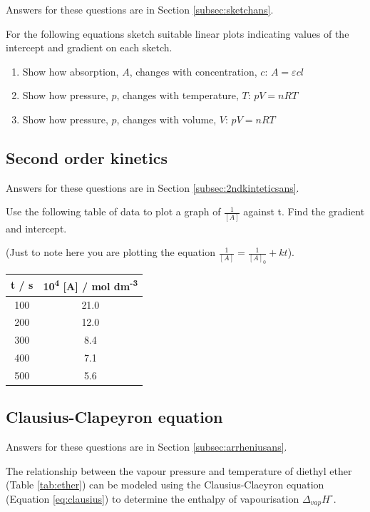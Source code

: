\documentclass[
]{book}
\begin{document}
Answers for these questions are in Section \ref{subsec:sketchans}.

For the following equations sketch suitable linear plots indicating values of the intercept and gradient on each sketch.

\begin{enumerate}
\def\labelenumi{\arabic{enumi}.}
\item
  Show how absorption, \(A\), changes with concentration, \(c\): \(A = \varepsilon c l\)
\item
  Show how pressure, \(p\), changes with temperature, \(T\): \(pV = nRT\)
\item
  Show how pressure, \(p\), changes with volume, \(V\): \(pV = nRT\)
\end{enumerate}

\hypertarget{subsec:2ndkintetics}{%
\subsection{Second order kinetics}\label{subsec:2ndkintetics}}

Answers for these questions are in Section \ref{subsec:2ndkinteticsans}.

Use the following table of data to plot a graph of \(\frac{1}{[A]}\) against t. Find the gradient and intercept.

(Just to note here you are plotting the equation \(\frac{1}{[A]}=\frac{1}{[A]_0}+kt\)).

\begin{longtable}[]{@{}cc@{}}
\toprule
t / s & 10\textsuperscript{4} {[}A{]} / mol dm\textsuperscript{-3} \\
\midrule
\endhead
100 & 21.0 \\
200 & 12.0 \\
300 & 8.4 \\
400 & 7.1 \\
500 & 5.6 \\
\bottomrule
\end{longtable}

\hypertarget{subsec:clausius}{%
\subsection{Clausius-Clapeyron equation}\label{subsec:clausius}}

Answers for these questions are in Section \ref{subsec:arrheniusans}.

The relationship between the vapour pressure and temperature of diethyl ether (Table \ref{tab:ether}) can be modeled using the Clausius-Claeyron equation (Equation \eqref{eq:clausius}) to determine the enthalpy of vapourisation \(\Delta _{vap}H^\circ\).
\end{document}
